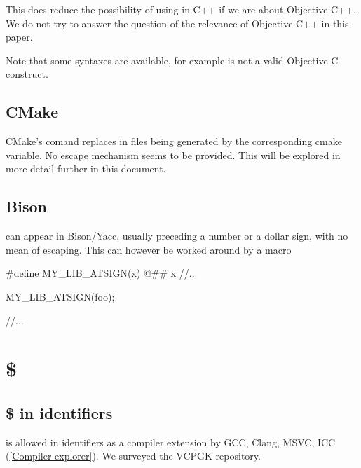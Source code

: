 \documentclass{wg21}
\begin{document}
    This does reduce the possibility of using  in C++ if we are about Objective-C++. We do not try to answer the question of the relevance of Objective-C++ in this paper.
    
    Note that some syntaxes are available, for example  is not a valid Objective-C construct.
    
    \subsection{CMake}
    
    CMake's  comand replaces  in files being generated by the corresponding cmake variable.
    No escape mechanism seems to be provided. This will be explored in more detail further in this document.
    
    \subsection{Bison}
    
     can appear in Bison/Yacc, usually preceding a number or a dollar sign, with no mean of escaping.
    This can however be worked around by a macro
    
    \begin{colorblock}
        #define MY_LIB_ATSIGN(x) @\atsign@ ## x
        //...
        
        MY_LIB_ATSIGN(foo);
        
        //...
        
    \end{colorblock}
    
    \section{\$}
    
    \subsection{\$ in identifiers}
    
    \tcode{\$} is allowed in identifiers as a compiler extension by GCC, Clang, MSVC, ICC (\href{https://godbolt.org/z/5P18rc}{[Compiler explorer]}).
    We surveyed the VCPGK repository.
    
\end{document}
